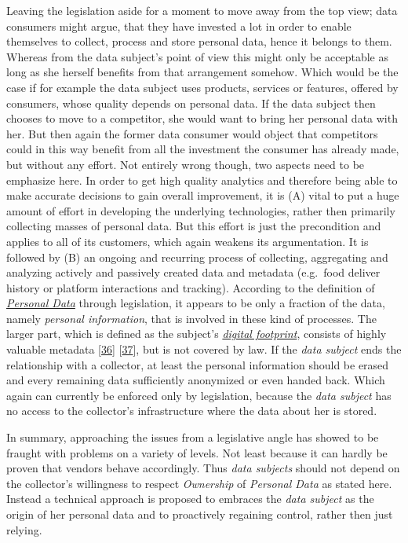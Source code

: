 \documentclass[12pt,english,a4paper,titlepage,cleardoublepage=empty,dottedtoc]{report}
\begin{document}
Leaving the legislation aside for a moment to move away from the top
view; data consumers might argue, that they have invested a lot in order
to enable themselves to collect, process and store personal data, hence
it belongs to them. Whereas from the data subject's point of view this
might only be acceptable as long as she herself benefits from that
arrangement somehow. Which would be the case if for example the data
subject uses products, services or features, offered by consumers, whose
quality depends on personal data. If the data subject then chooses to
move to a competitor, she would want to bring her personal data with
her. But then again the former data consumer would object that
competitors could in this way benefit from all the investment the
consumer has already made, but without any effort. Not entirely wrong
though, two aspects need to be emphasize here. In order to get high
quality analytics and therefore being able to make accurate decisions to
gain overall improvement, it is (A) vital to put a huge amount of effort
in developing the underlying technologies, rather then primarily
collecting masses of personal data. But this effort is just the
precondition and applies to all of its customers, which again weakens
its argumentation. It is followed by (B) an ongoing and recurring
process of collecting, aggregating and analyzing actively and passively
created data and metadata (e.g.~food deliver history or platform
interactions and tracking). According to the definition of
\emph{\protect\hyperlink{def--personal-data-as-of-legis}{Personal Data}}
through legislation, it appears to be only a fraction of the data,
namely \emph{personal information}, that is involved in these kind of
processes. The larger part, which is defined as the subject's
\emph{\protect\hyperlink{terminologies--digital-footprint}{digital
footprint}}, consists of highly valuable metadata
{[}\protect\hyperlink{ref-web_2013_why-metadata-matters}{36}{]}
{[}\protect\hyperlink{ref-web_2016_why-you-need-metadata-for-big-data-to-success}{37}{]},
but is not covered by law. If the \emph{data subject} ends the
relationship with a collector, at least the personal information should
be erased and every remaining data sufficiently anonymized or even
handed back. Which again can currently be enforced only by legislation,
because the \emph{data subject} has no access to the collector's
infrastructure where the data about her is stored.

In summary, approaching the issues from a legislative angle has showed
to be fraught with problems on a variety of levels. Not least because it
can hardly be proven that vendors behave accordingly. Thus \emph{data
subjects} should not depend on the collector's willingness to respect
\emph{Ownership} of \emph{Personal Data} as stated here. Instead a
technical approach is proposed to embraces the \emph{data subject} as
the origin of her personal data and to proactively regaining control,
rather then just relying.
\end{document}

